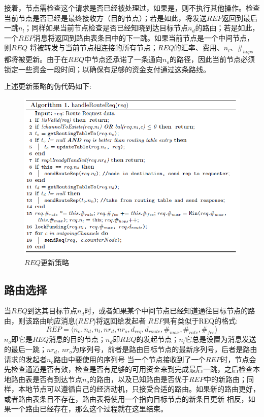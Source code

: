 \documentclass[12pt,a4paper]{article}
\begin{document}
接着，节点需检查这个请求是否已经被处理过，如果是，则不执行其他操作。检查当前节点是否已经是最终接收方（目的节点）；若是如此，将发送$REP$返回到最后一跳$n_l$；同样如果当前节点检查是否已经知晓到达目标节点$n_d$的路由；若是如此，一个$REP$消息将返回到路由表条目中的下一跳。如果当前节点是一个中间节点，则$REQ$ 将被转发与当前节点相连接的所有节点；$REQ$的汇率、费用、$n_l$、$\#_{hops}$都将被更新。由于在$REQ$中节点还承诺了一条通向$n_o$的路径，因此当前节点必须锁定一些资金一段时间；以确保有足够的资金支付通过这条路线。

上述更新策略的伪代码如下:
\begin{figure}[htb]
\centering
\includegraphics[width=14cm]{req_update}
\caption{$REQ$更新策略}
\end{figure}

\subsection{路由选择}
当$REQ$到达其目标节点$n_d$时，或者如果某个中间节点已经知道通往目标节点的路由，则该路由响应消息($REP$)将返回给发起者
$REP$具有类似于REQ的格式:
\begin{equation}
REP=\langle n_o, n_d, n_l, {nr}_d, {nr}_o, d_{req},d_{route}, \#_{max}, \#_{rate},\#_{fee}\rangle
\end{equation}
$n_o$即它是$REQ$消息的目的节点；$n_d$即$REQ$的发起节点；$n_l$它总是设置为消息发送的最后一跳；${nr}_d,\ {nr}_o$为序列号，前者是路由目标节点的最新序列号，后者是路由请求的发起者$n_o$路由中要使用的序列号
当一个节点接收到了一个$REP$时，节点会先检查通道是否有效，检查是否有足够的可用资金来到完成最后一跳，之后检查本地路由表是否有到达节点$n_o$的路由，以及已知路由是否优于$REP$中的新路由；同样，本地节点可以遵循自己的经济动机，只接受合适的路由。如果新的路由更好，或者路由表条目不存在，路由表将使用一个指向目标节点的新条目更新
相反，如果一个路由已经存在，那么这个过程就在这里结束。
\end{document}
